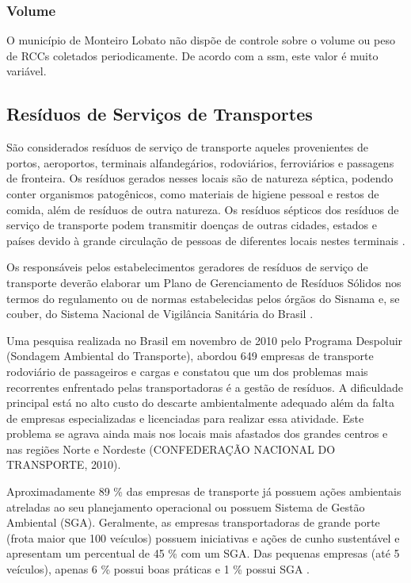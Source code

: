 	
	\subsubsection{Volume}
	O município de Monteiro Lobato não dispõe de controle sobre o volume ou peso de RCCs coletados periodicamente. De acordo com a \gls{ssm}, este valor é muito variável.
	
	
	\subsection{Resíduos de Serviços de Transportes}
	
	São considerados resíduos de serviço de transporte aqueles provenientes de portos, aeroportos, terminais alfandegários, rodoviários, ferroviários e passagens de fronteira. Os resíduos gerados nesses locais são de natureza séptica, podendo conter organismos patogênicos, como materiais de higiene pessoal e restos de comida, além de resíduos de outra natureza. Os resíduos sépticos dos resíduos de serviço de transporte podem transmitir doenças de outras cidades, estados e países devido à grande circulação de pessoas de diferentes locais nestes terminais \cite{brasil:12305}.
	
	Os responsáveis pelos estabelecimentos geradores de resíduos de serviço de transporte deverão elaborar um Plano de Gerenciamento de Resíduos Sólidos nos termos do regulamento ou de normas estabelecidas pelos órgãos do Sisnama e, se couber, do Sistema Nacional de Vigilância Sanitária do Brasil \cite{brasil:12305}.
	
	Uma pesquisa realizada no Brasil em novembro de 2010 pelo Programa Despoluir (Sondagem Ambiental do Transporte), abordou 649 empresas de transporte rodoviário de passageiros e cargas e constatou que um dos problemas mais recorrentes enfrentado pelas transportadoras é a gestão de resíduos. A dificuldade principal está no alto custo do descarte ambientalmente adequado além da falta de empresas especializadas e licenciadas para realizar essa atividade. Este problema se agrava ainda mais nos locais mais afastados dos grandes centros e nas regiões Norte e Nordeste (CONFEDERAÇÃO NACIONAL DO TRANSPORTE, 2010).
	
	Aproximadamente 89 \% das empresas de transporte já possuem ações ambientais atreladas ao seu planejamento operacional ou possuem Sistema de Gestão Ambiental (SGA). Geralmente, as empresas transportadoras de grande porte (frota maior que 100 veículos) possuem iniciativas e ações de cunho sustentável e apresentam um percentual de 45 \% com um SGA. Das pequenas empresas (até 5 veículos), apenas 6 \% possui boas práticas e 1 \% possui SGA \cite{Paixao2011}.
	
